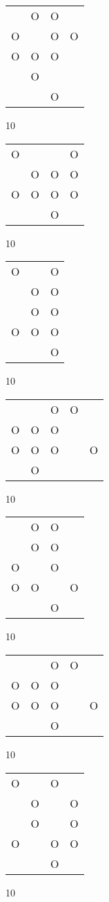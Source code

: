 \begin{tabular}{|m{0.2cm}m{0.2cm}m{0.2cm}m{0.2cm}|}\hline
 &O&O& \\
O& &O&O\\
O&O&O& \\
 &O& & \\
 & &O& \\
\hline\end{tabular}10
\begin{tabular}{|m{0.2cm}m{0.2cm}m{0.2cm}m{0.2cm}|}\hline
O& & &O\\
 &O&O&O\\
O&O&O&O\\
 & &O& \\
\hline\end{tabular}10
\begin{tabular}{|m{0.2cm}m{0.2cm}m{0.2cm}|}\hline
O& &O\\
 &O&O\\
 &O&O\\
O&O&O\\
 & &O\\
\hline\end{tabular}10
\begin{tabular}{|m{0.2cm}m{0.2cm}m{0.2cm}m{0.2cm}m{0.2cm}|}\hline
 & &O&O& \\
O&O&O& & \\
O&O&O& &O\\
 &O& & & \\
\hline\end{tabular}10
\begin{tabular}{|m{0.2cm}m{0.2cm}m{0.2cm}m{0.2cm}|}\hline
 &O&O& \\
 &O&O& \\
O& &O& \\
O&O& &O\\
 & &O& \\
\hline\end{tabular}10
\begin{tabular}{|m{0.2cm}m{0.2cm}m{0.2cm}m{0.2cm}m{0.2cm}|}\hline
 & &O&O& \\
O&O&O& & \\
O&O&O& &O\\
 & &O& & \\
\hline\end{tabular}10
\begin{tabular}{|m{0.2cm}m{0.2cm}m{0.2cm}m{0.2cm}|}\hline
O& &O& \\
 &O& &O\\
 &O& &O\\
O& &O&O\\
 & &O& \\
\hline\end{tabular}10
